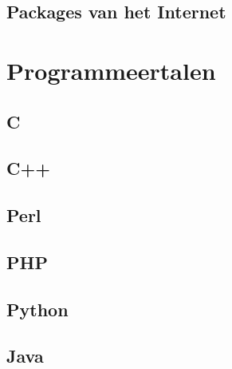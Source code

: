 \documentclass[a4paper,12pt,twoside,openright,titlepage]{book}
\begin{document}
\section{Packages van het Internet}


\chapter{Programmeertalen}


\section{C}

\section{C++}

\section{Perl}

\section{PHP}

\section{Python}

\section{Java}

\end{document}
